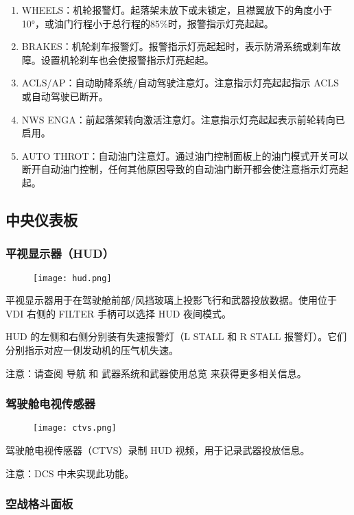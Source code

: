 \begin{enumerate}
  \item WHEELS：机轮报警灯。起落架未放下或未锁定，且襟翼放下的角度小于10°，或油门行程小于总行程的85\%时，报警指示灯亮起起。
  \item BRAKES：机轮刹车报警灯。报警指示灯亮起起时，表示防滑系统或刹车故障。设置机轮刹车也会使报警指示灯亮起起。
  \item ACLS/AP：自动助降系统/自动驾驶注意灯。注意指示灯亮起起指示 ACLS 或自动驾驶已断开。
  \item NWS ENGA：前起落架转向激活注意灯。注意指示灯亮起起表示前轮转向已启用。
  \item AUTO THROT：自动油门注意灯。通过油门控制面板上的油门模式开关可以断开自动油门控制，任何其他原因导致的自动油门断开都会使注意指示灯亮起起。
\end{enumerate}


\subsection{中央仪表板}

\subsubsection{平视显示器（HUD）}

\begin{figure}[htb]
  \center
  \texttt{[image: hud.png]}
\end{figure}
平视显示器用于在驾驶舱前部/风挡玻璃上投影飞行和武器投放数据。使用位于 VDI 右侧的 FILTER 手柄可以选择 HUD 夜间模式。

HUD 的左侧和右侧分别装有失速报警灯（L STALL 和 R STALL 报警灯）。它们分别指示对应一侧发动机的压气机失速。

注意：请查阅 导航 和 武器系统和武器使用总览 来获得更多相关信息。

\subsubsection{驾驶舱电视传感器}

\begin{figure}[htb]
  \center
  \texttt{[image: ctvs.png]}
\end{figure}
驾驶舱电视传感器（CTVS）录制 HUD 视频，用于记录武器投放信息。

注意：DCS 中未实现此功能。

\subsubsection{空战格斗面板}

